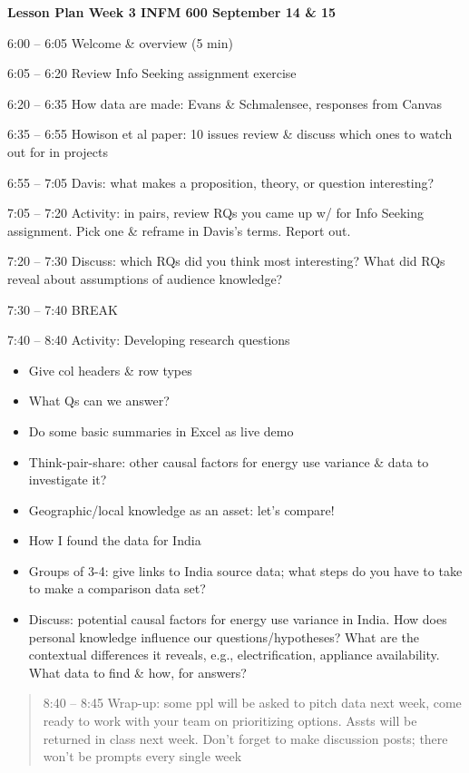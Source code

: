 \documentclass[]{article}
\date{}
\begin{document}
\textbf{Lesson Plan Week 3 INFM 600 September 14 \& 15}

6:00 -- 6:05 Welcome \& overview (5 min)

6:05 -- 6:20 Review Info Seeking assignment exercise

6:20 -- 6:35 How data are made: Evans \& Schmalensee, responses from
Canvas

6:35 -- 6:55 Howison et al paper: 10 issues review \& discuss which ones
to watch out for in projects

6:55 -- 7:05 Davis: what makes a proposition, theory, or question
interesting?

7:05 -- 7:20 Activity: in pairs, review RQs you came up w/ for Info
Seeking assignment. Pick one \& reframe in Davis's terms. Report out.

7:20 -- 7:30 Discuss: which RQs did you think most interesting? What did
RQs reveal about assumptions of audience knowledge?

7:30 -- 7:40 BREAK

7:40 -- 8:40 Activity: Developing research questions

\begin{itemize}
\item
  Give col headers \& row types
\item
  What Qs can we answer?
\item
  Do some basic summaries in Excel as live demo
\item
  Think-pair-share: other causal factors for energy use variance \& data
  to investigate it?
\item
  Geographic/local knowledge as an asset: let's compare!
\item
  How I found the data for India
\item
  Groups of 3-4: give links to India source data; what steps do you have
  to take to make a comparison data set?
\item
  Discuss: potential causal factors for energy use variance in India.
  How does personal knowledge influence our questions/hypotheses? What
  are the contextual differences it reveals, e.g., electrification,
  appliance availability. What data to find \& how, for answers?
\end{itemize}

\begin{quote}
8:40 -- 8:45 Wrap-up: some ppl will be asked to pitch data next week,
come ready to work with your team on prioritizing options. Assts will be
returned in class next week. Don't forget to make discussion posts;
there won't be prompts every single week
\end{quote}
\end{document}
